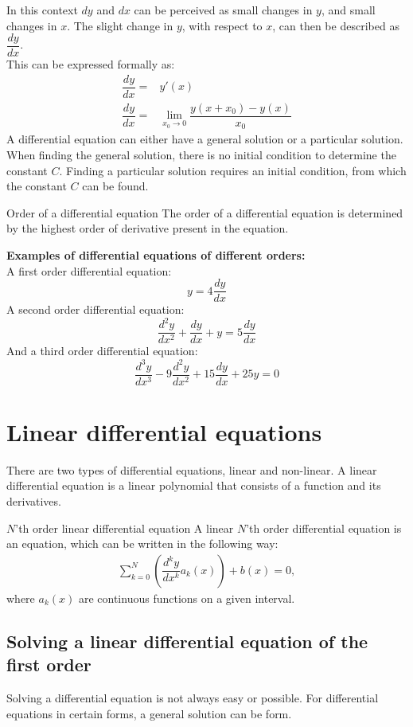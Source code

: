 In this context $dy$ and $dx$ can be perceived as small changes in $y$, and small changes in $x$. The slight change in $y$, with respect to $x$, can then be described as $\dfrac{dy}{dx}$.
\\
This can be expressed formally as:
\\
\begin{align*}
	\dfrac{dy}{dx} =& y'(x) \\
	\dfrac{dy}{dx} =& \lim_{x_0\to 0} \dfrac{y(x+x_0)-y(x)}{x_0}
\end{align*}
A differential equation can either have a general solution or a particular solution. When finding the general solution, there is no initial condition to determine the constant $C$. Finding a particular solution requires an initial condition, from which the constant $C$ can be found.

\clearpage

\begin{definition}{Order of a differential equation}{}
The order of a differential equation is determined by the highest order of derivative present in the equation.
\end{definition} 

\noindent
\textbf{Examples of differential equations of different orders:}
\\
A first order differential equation:
$$y=4\frac{dy}{dx} $$
A second order differential equation:
$$\frac{d^2y}{dx^2}+\frac{dy}{dx}+y = 5\frac{dy}{dx}$$
And a third order differential equation:
$$\frac{d^3y}{dx^3} - 9\frac{d^2y}{dx^2} + 15\frac{dy}{dx} + 25y = 0$$

\section{Linear differential equations}
There are two types of differential equations, linear and non-linear. A linear differential equation is a linear polynomial that consists of a function and its derivatives.
\begin{definition}{$N$'th order linear differential equation}{}
A linear $N$'th order differential equation is an equation, which can be written in the following way:
\begin{align*}
\sum_{k=0}^{N}\left(\dfrac{d^ky}{dx^k}a_k(x)\right)+b(x)=0,
\end{align*}
where $a_k(x)$ are continuous functions on a given interval.
\end{definition}
\subsection{Solving a linear differential equation of the first order}
Solving  a differential equation is not always easy or possible. For differential equations in certain forms, a general solution can be form.

